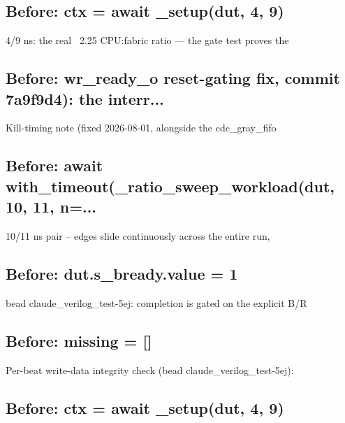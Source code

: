 \begin{record}
\subsection*{Before: ctx = await \_setup(dut, 4, 9)}

\begin{textblock}
4/9 ns: the real ~2.25 CPU:fabric ratio — the gate test proves the
\end{textblock}

\subsection*{Before: wr\_ready\_o reset-gating fix, commit 7a9f9d4): the interr...}

\begin{textblock}
Kill-timing note (fixed 2026-08-01, alongside the cdc_gray_fifo
\end{textblock}

\subsection*{Before: await with\_timeout(\_ratio\_sweep\_workload(dut, 10, 11, n=...}

\begin{textblock}
10/11 ns pair -- edges slide continuously across the entire run,
\end{textblock}

\subsection*{Before: dut.s\_bready.value = 1}

\begin{textblock}
bead claude_verilog_test-5ej: completion is gated on the explicit B/R
\end{textblock}

\subsection*{Before: missing = []}

\begin{textblock}
Per-beat write-data integrity check (bead claude_verilog_test-5ej):
\end{textblock}

\subsection*{Before: ctx = await \_setup(dut, 4, 9)}


\end{record}
